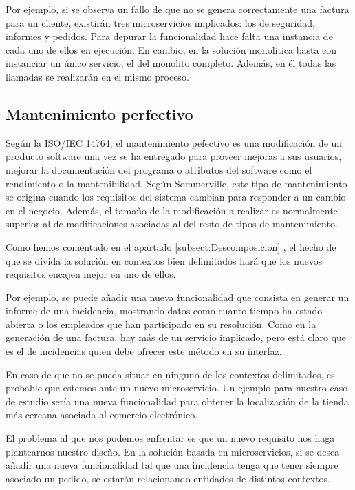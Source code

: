 \documentclass[11pt,spanish,listoffigures]{tfgetsinf}
\begin{document}
Por ejemplo, si se observa un fallo de que no se genera correctamente una factura para un cliente, existirán tres microservicios implicados: los de seguridad, informes y pedidos. Para depurar la funcionalidad hace falta una instancia de cada uno de ellos en ejecución. En cambio, en la solución monolítica basta con instanciar un único servicio, el del monolito completo. Además, en él todas las llamadas se realizarán en el mismo proceso.

\subsection{Mantenimiento perfectivo}


Según la ISO/IEC 14764, el mantenimiento pefectivo es una modificación de un producto software una vez se ha entregado para proveer mejoras a sus usuarios, mejorar la documentación del programa o atributos del software como el rendimiento o la mantenibilidad. \cite{Bourque2014} Según Sommerville, este tipo de mantenimiento se origina cuando los requisitos del sistema cambian para responder a un cambio en el negocio. Además, el tamaño de la modificación a realizar es normalmente superior al de modificaciones asociadas al del resto de tipos de mantenimiento. \cite{Sommerville2010}

Como hemos comentado en el apartado \ref{subsect:Descomposicion} , el hecho de que se divida la solución en contextos bien delimitados hará que los nuevos requisitos encajen mejor en uno de ellos.

Por ejemplo, se puede añadir una nueva funcionalidad que consista en generar un informe de una incidencia, mostrando datos como cuanto tiempo ha estado abierta o los empleados que han participado en su resolución. Como en la generación de una factura, hay más de un servicio implicado, pero está claro que es el de incidencias quien debe ofrecer este método en su interfaz.

En caso de que no se pueda situar en ninguno de los contextos delimitados, es probable que estemos ante un nuevo microservicio. Un ejemplo para nuestro caso de estudio sería una nueva funcionalidad para obtener la localización de la tienda más cercana asociada al comercio electrónico.

El problema al que nos podemos enfrentar es que un nuevo requisito nos haga plantearnos nuestro diseño. En la solución basada en microservicios, si se desea añadir una nueva funcionalidad tal que una incidencia tenga que tener siempre asociado un pedido, se estarán relacionando entidades de distintos contextos. 
\end{document}

